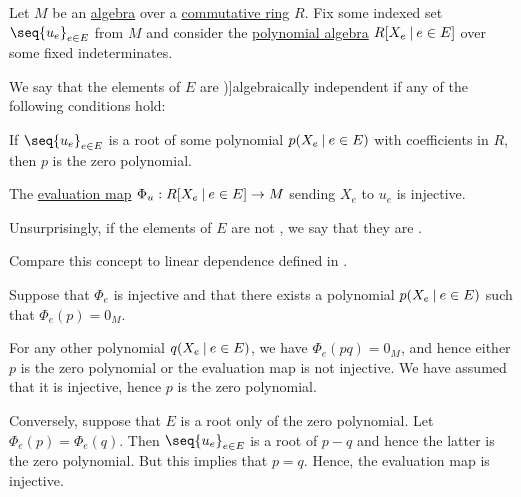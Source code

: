 \begin{definition}\label{def:algebraic_dependence}\mimprovised
  Let \( M \) be an \hyperref[def:algebra_over_ring]{algebra} over a \hyperref[def:ring/commutative]{commutative ring} \( R \). Fix some indexed set \( \seq{ u_e }_{e \in E} \) from \( M \) and consider the \hyperref[def:polynomial_algebra]{polynomial algebra} \( R[X_e \given e \in E] \) over some fixed indeterminates.

  We say that the elements of \( E \) are \term[ru=алгебрически независимые (елементы) (\cite[408]{Винберг2014Алгебра})]{algebraically independent} if any of the following conditions hold:

  \begin{thmenum}
     If \( \seq{ u_e }_{e \in E} \) is a root of some polynomial \( p(X_e \given e \in E) \) with coefficients in \( R \), then \( p \) is the zero polynomial.

     The \hyperref[thm:polynomial_algebra_universal_property]{evaluation map} \( \Phi_u: R[X_e \given e \in E] \to M \) sending \( X_e \) to \( u_e \) is injective.
  \end{thmenum}
\end{definition}
\begin{comments}
  \item Unsurprisingly, if the elements of \( E \) are not , we say that they are .
  \item Compare this concept to linear dependence defined in .
\end{comments}
\begin{defproof}
   Suppose that \( \Phi_e \) is injective and that there exists a polynomial \( p(X_e \given e \in E) \) such that \( \Phi_e(p) = 0_M \).

  For any other polynomial \( q(X_e \given e \in E) \), we have \( \Phi_e(p q) = 0_M \), and hence either \( p \) is the zero polynomial or the evaluation map is not injective. We have assumed that it is injective, hence \( p \) is the zero polynomial.

   Conversely, suppose that \( E \) is a root only of the zero polynomial. Let \( \Phi_e(p) = \Phi_e(q) \). Then \( \seq{ u_e }_{e \in E} \) is a root of \( p - q \) and hence the latter is the zero polynomial. But this implies that \( p = q \). Hence, the evaluation map is injective.
\end{defproof}

